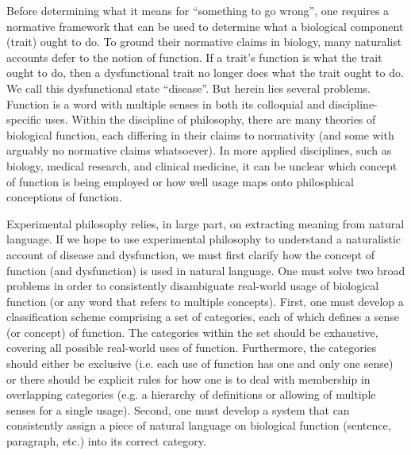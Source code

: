 \documentclass{article}
\begin{document}
Before determining what it means for ``something to go wrong'', one requires a normative framework that can be used to determine what a biological component (trait) ought to do.
To ground their normative claims in biology, many naturalist accounts defer to the notion of function.
If a trait's function is what the trait ought to do, then a dysfunctional trait no longer does what the trait ought to do.
We call this dysfunctional state ``disease''.
But herein lies several problems.
Function is a word with multiple senses in both its colloquial and discipline-specific uses.
Within the discipline of philosophy, there are many theories of biological function, each differing in their claims to normativity (and some with arguably no normative claims whatsoever).
In more applied disciplines, such as biology, medical research, and clinical medicine, it can be unclear which concept of function is being employed or how well usage maps onto philosphical conceptions of function.

Experimental philosophy relies, in large part, on extracting meaning from natural language.
If we hope to use experimental philosophy to understand a naturalistic account of disease and dysfunction, we must first clarify how the concept of function (and dysfunction) is used in natural language.
One must solve two broad problems in order to consistently disambiguate real-world usage of biological function (or any word that refers to multiple concepts).
First, one must develop a classification scheme comprising a set of categories, each of which defines a sense (or concept) of function.
The categories within the set should be exhaustive, covering all possible real-world uses of function.
Furthermore, the categories should either be exclusive (i.e. each use of function has one and only one sense) or there should be explicit rules for how one is to deal with membership in overlapping categories (e.g. a hierarchy of definitions or allowing of multiple senses for a single usage). 
Second, one must develop a system that can consistently assign a piece of natural language on biological function (sentence, paragraph, etc.) into its correct category.
\end{document}
